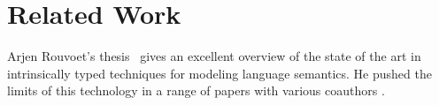 \documentclass[acmsmall,anonymous,review,screen]{acmart}
\begin{document}
\SubstExamplesAppendR

\SubstExamplesAssocR

\SubstExamplesAssocRHet

\SubstExamplesDistSubst
\SubstExamplesSubstRemovable









\section{Related Work}
\label{sec:related-work}

Arjen Rouvoet's thesis~\cite{DBLP:phd/basesearch/Rouvoet21} gives an
excellent overview of the state of the art in intrinsically typed
techniques for modeling language semantics. He pushed the limits of
this technology in a range of papers with various coauthors
\cite{DBLP:journals/pacmpl/RestPRVM22,DBLP:journals/pacmpl/RouvoetKV21,DBLP:conf/cpp/RouvoetPKV20,DBLP:journals/pacmpl/PoulsenRTKV18}. 
\end{document}
